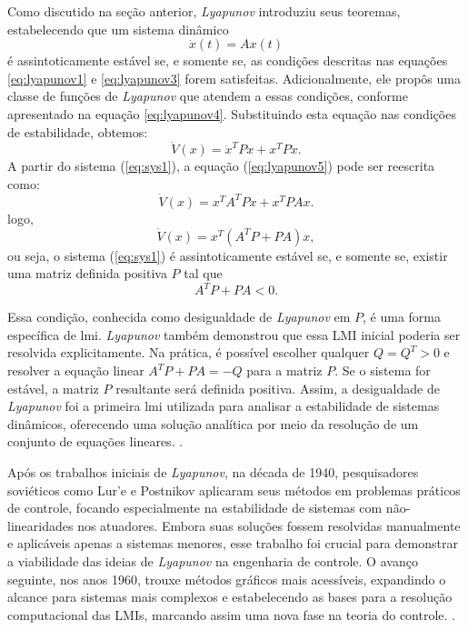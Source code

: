 Como discutido na seção anterior, \textit{Lyapunov }introduziu seus teoremas, estabelecendo que um sistema dinâmico \begin{equation} \dot{x}(t) = Ax(t) \label{eq:sys1}\end{equation} é assintoticamente estável se, e somente se, as condições descritas nas equações \eqref{eq:lyapunov1} e \eqref{eq:lyapunov3} forem satisfeitas. Adicionalmente, ele propôs uma classe de funções de \textit{Lyapunov }que atendem a essas condições, conforme apresentado na equação \eqref{eq:lyapunov4}. Substituindo esta equação nas condições de estabilidade, obtemos: \begin{equation} \dot{V}(x) = \dot{x}^TPx + x^TP\dot{x} \label{eq:lyapunov5}. \end{equation} A partir do sistema (\ref{eq:sys1}), a equação (\ref{eq:lyapunov5}) pode ser reescrita como: \begin{equation} \dot{V}(x) = x^TA^TPx + x^TPAx \label{eq:lyapunov6}. \end{equation} logo, \begin{equation} \dot{V}(x) = x^T (A^TP + PA) x \label{eq:lyapunov7}, \end{equation} ou seja, o sistema (\ref{eq:sys1}) é assintoticamente estável se, e somente se, existir uma matriz definida positiva $P$ tal que \begin{equation} A^T P + P A < 0.\end{equation}

Essa condição, conhecida como desigualdade de \textit{Lyapunov }em $P$, é uma forma específica de \acrshort{lmi}. \textit{Lyapunov }também demonstrou que essa LMI inicial poderia ser resolvida explicitamente. Na prática, é possível escolher qualquer $Q = Q^T > 0$ e resolver a equação linear $A^T P + P A = -Q$ para a matriz $P$. Se o sistema for estável, a matriz $P$ resultante será definida positiva. Assim, a desigualdade de \textit{Lyapunov }foi a primeira \acrshort{lmi} utilizada para analisar a estabilidade de sistemas dinâmicos, oferecendo uma solução analítica por meio da resolução de um conjunto de equações lineares. \citep{lyapunov1892,boyd1994}.

Após os trabalhos iniciais de \textit{Lyapunov}, na década de 1940, pesquisadores soviéticos como Lur'e e Postnikov aplicaram seus métodos em problemas práticos de controle, focando especialmente na estabilidade de sistemas com não-linearidades nos atuadores. Embora suas soluções fossem resolvidas manualmente e aplicáveis apenas a sistemas menores, esse trabalho foi crucial para demonstrar a viabilidade das ideias de \textit{Lyapunov }na engenharia de controle. O avanço seguinte, nos anos 1960, trouxe métodos gráficos mais acessíveis, expandindo o alcance para sistemas mais complexos e estabelecendo as bases para a resolução computacional das LMIs, marcando assim uma nova fase na teoria do controle. \citep{boyd1994}.

